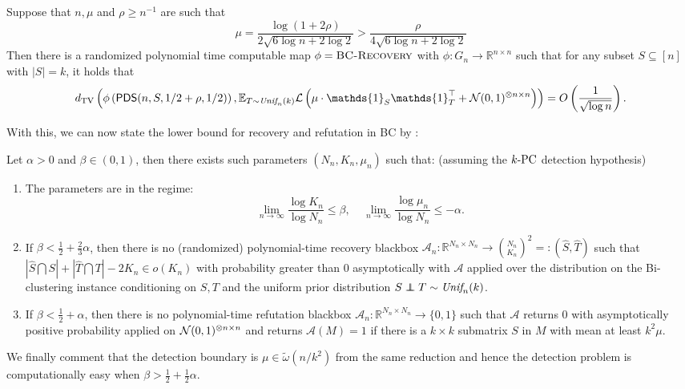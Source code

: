 \documentclass[final,12pt]{colt2023} %
\newcommand\1[1]{\mathbb{I}_{\left\{#1\right\}}}
\newcommand{\one}{\mathds{1}}
\begin{document}
\begin{lemma} \label{lem:bcrec}
Suppose that $n, \mu$ and $\rho \ge n^{-1}$ are such that
$$\mu = \frac{\log (1 + 2\rho)}{2 \sqrt{6 \log n + 2\log 2}}>\frac{\rho}{4 \sqrt{6 \log n + 2\log 2}}$$
Then there is a randomized polynomial time computable map $\phi = \textsc{BC-Recovery}$ with $\phi : G_n \to \mathbb{R}^{n \times n}$ such that for any subset $S \subseteq [n]$ with $|S| = k$, it holds that
$$\dTV\left( \phi\left(\pd(n, S, 1/2 + \rho, 1/2)\right), \mathbb{E}_{T\sim \textit{Unif}_n(k)} \mathcal{L}\left( \mu \cdot \one_S \one_T^\top + \N(0, 1)^{\otimes n \times n} \right) \right) = O\left(\frac{1}{\sqrt{\log n}} \right).$$
\end{lemma}
With this, we can now state the lower bound for recovery and refutation in BC by :
\begin{corollary}
Let $\alpha>0$ and $\beta\in(0,1)$, then there exists such parameters $(N_n, K_n, \mu_n)$ such that: (assuming the $k\textup{-PC}$ detection hypothesis)
\begin{enumerate}
    \item The parameters are in the regime:
    $$\lim_{n\to\infty}\frac{\log K_n}{\log N_n}\leq \beta,\;\;\;\; \lim_{n\to\infty}\frac{\log \mu_n}{\log N_n}\leq -\alpha.$$
    \item If $\beta<\frac{1}{2}+\frac{2}{3}\alpha$, then there is no (randomized) polynomial-time recovery blackbox $\mathcal{A}_n: \mathbb{R}^{N_n\times N_n}\to {N_n\choose K_n}^2=:(\hat S, \hat T)$ such that $|\hat S\bigcap S|+|\hat T\bigcap T|-2K_n\in o(K_n)$ with probability greater than 0 asymptotically with $\mathcal{A}$ applied over the distribution on the Bi-clustering instance conditioning on $S, T$ and the uniform prior distribution $S\indep T\sim \textit{Unif}_n(k)$.
    \item If $\beta<\frac{1}{2}+\alpha$, then there is no polynomial-time refutation blackbox $\mathcal{A}_n: \mathbb{R}^{N_n\times N_n}\to \{0,1\}$ such that $\mathcal{A}$ returns 0 with asymptotically positive probability applied on $\mathcal{N}(0, 1)^{\otimes n\times n}$ and returns $\mathcal{A}(M)=1$ if there is a $k\times k$ submatrix $S$ in $M$ with mean at least $k^2\mu$. 
\end{enumerate}
\end{corollary}
We finally comment that the detection boundary is $\mu\in\tilde\omega(n/k^2)$ from the same reduction and hence the detection problem is computationally easy when $\beta>\frac{1}{2}+\frac{1}{2}\alpha$.
\end{document}
